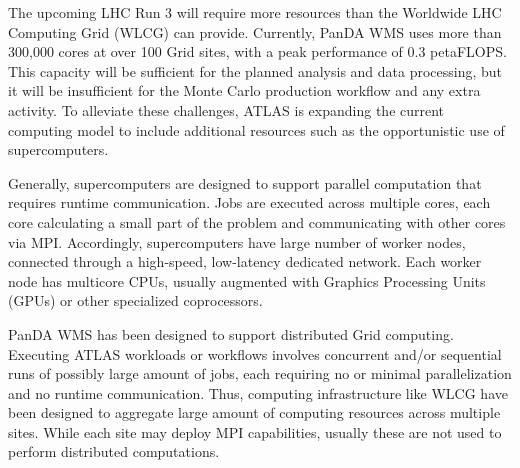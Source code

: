 The upcoming LHC Run 3 will require more resources than the Worldwide LHC
Computing Grid (WLCG) can provide. Currently, PanDA WMS uses more than
300,000 cores at over 100 Grid sites, with a peak performance of 0.3
petaFLOPS\@. This capacity will be sufficient for the planned analysis and
data processing, but it will be insufficient for the Monte Carlo production
workflow and any extra activity. To alleviate these challenges, ATLAS is
expanding the current computing model to include additional resources such as
the opportunistic use of supercomputers.

Generally, supercomputers are designed to support parallel computation that
requires runtime communication. Jobs are executed across multiple cores, each
core calculating a small part of the problem and communicating with other
cores via MPI\@. Accordingly, supercomputers have large number of worker
nodes, connected through a high-speed, low-latency dedicated network. Each
worker node has multicore CPUs, usually augmented with Graphics Processing
Units (GPUs) or other specialized coprocessors.

PanDA WMS has been designed to support distributed Grid computing. Executing
ATLAS workloads or workflows involves concurrent and/or sequential runs of
possibly large amount of jobs, each requiring no or minimal parallelization
and no runtime communication. Thus, computing infrastructure like WLCG have
been designed to aggregate large amount of computing resources across
multiple sites. While each site may deploy MPI capabilities, usually these
are not used to perform distributed computations.


